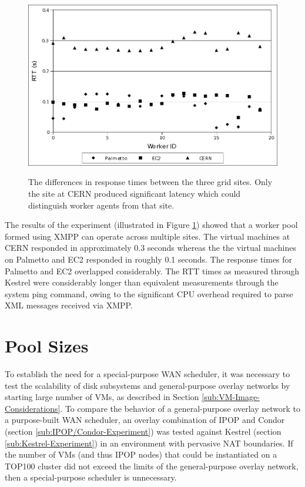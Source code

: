 \begin{figure}
\includegraphics[width=\columnwidth]{figures/xmpp_rtt}
\label{fig:Ping-Response-Times}
\caption{The differences in response times between the three grid sites. Only the
site at CERN produced significant latency which could distinguish worker agents from
that site.}
\end{figure}

The results of the experiment (illustrated in Figure
\ref{fig:Ping-Response-Times}) showed that a worker pool formed using XMPP
can operate across multiple sites. The virtual machines at CERN responded in
approximately 0.3 seconds whereas the the virtual machines on Palmetto and
EC2 responded in roughly 0.1 seconds. The response times for Palmetto and
EC2 overlapped considerably. The RTT times as measured through Kestrel were
considerably longer than equivalent measurements through the system ping
command, owing to the significant CPU overhead required to parse XML messages
received via XMPP.

\section{\label{sub:Pool-Sizes}Pool Sizes}
To establish the need for a special-purpose WAN scheduler, it was
necessary to test the scalability of disk subsystems and general-purpose
overlay networks by starting large number of VMs, as described in
Section \ref{sub:VM-Image-Considerations}. To compare the behavior
of a general-purpose overlay network to a purpose-built WAN scheduler,
an overlay combination of IPOP and Condor (section \ref{sub:IPOP/Condor-Experiment})
was tested against Kestrel (section \ref{sub:Kestrel-Experiment})
in an environment with pervasive NAT boundaries. If the number of
VMs (and thus IPOP nodes) that could be instantiated on a TOP100 cluster
did not exceed the limits of the general-purpose overlay network,
then a special-purpose scheduler is unnecessary. 


